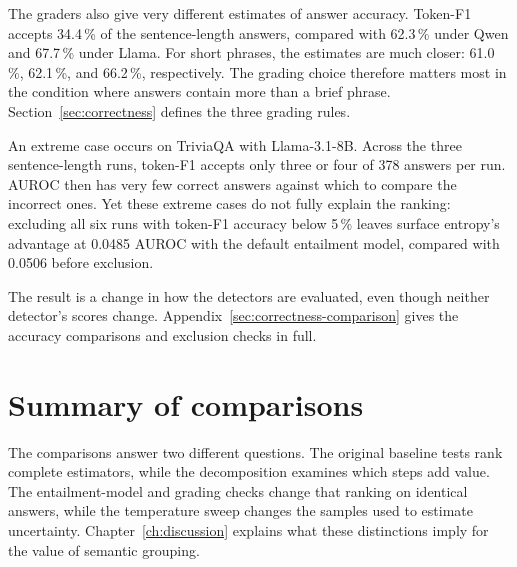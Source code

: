 The graders also give very different estimates of answer accuracy. Token-F1
accepts 34.4\,\% of the sentence-length answers, compared with 62.3\,\% under
Qwen and 67.7\,\% under Llama. For short phrases, the estimates are much closer:
61.0\,\%, 62.1\,\%, and 66.2\,\%, respectively. The grading choice therefore
matters most in the condition where answers contain more than a brief phrase.
Section~\ref{sec:correctness} defines the three grading rules.

An extreme case occurs on TriviaQA with Llama-3.1-8B. Across the three
sentence-length runs, token-F1 accepts only three or four of 378 answers per
run. AUROC then has very few correct answers against which to compare the
incorrect ones. Yet these extreme cases do not fully explain the ranking:
excluding all six runs with token-F1 accuracy below 5\,\% leaves surface
entropy's advantage at 0.0485 AUROC with the default entailment model, compared
with 0.0506 before exclusion.

The result is a change in how the detectors are evaluated, even though neither
detector's scores change. Appendix~\ref{sec:correctness-comparison} gives the
accuracy comparisons and exclusion checks in full.

\section{Summary of comparisons}
\label{sec:secondary-results-overview}

The comparisons answer two different questions. The original baseline tests
rank complete estimators, while the decomposition examines which steps add
value. The entailment-model and grading checks change that ranking on identical
answers, while the temperature sweep changes the samples used to estimate uncertainty.
Chapter~\ref{ch:discussion} explains what these distinctions imply for the
value of semantic grouping.
\clearpage

